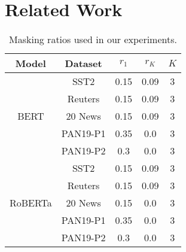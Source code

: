 \section{Related Work}
\label{sec:appendix1}
\begin{table}[t!]
    \centering
    \begin{tabular}{|c| c| c|c|c|}
    \hline
         Model & Dataset & $r_1$& $r_K$& $K$ \\
         \hline
         \hline
         \multirow{5}{*}{BERT}& SST2 &0.15& 0.09& 3\\
             & Reuters & 0.15 & 0.09& 3\\
             & 20 News & 0.15 & 0.09& 3\\
              & PAN19-P1 & 0.35 & 0.0 & 3\\
              & PAN19-P2 & 0.3 & 0.0 & 3\\
        \hline
        \multirow{5}{*}{RoBERTa}& SST2 &0.15& 0.09& 3\\
             & Reuters & 0.15 & 0.09& 3\\
             & 20 News & 0.15 & 0.0 & 3\\
              & PAN19-P1 & 0.35 & 0.0 & 3\\
              & PAN19-P2 & 0.3 & 0.0 & 3\\
             \hline
         
    \end{tabular}
    \caption{Masking ratios used in our experiments.}
    \label{table_hyperparams}
\end{table}
